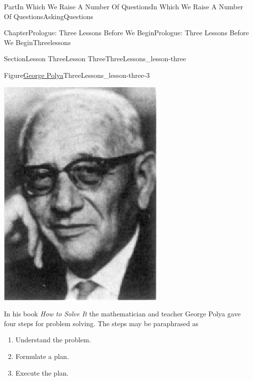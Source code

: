 \documentclass[oneside,10pt,]{book}
\numberwithin{equation}{part}
\begin{document}
\begin{partptx}{Part}{In Which We Raise A Number Of Questions}{}{In Which We Raise A Number Of Questions}{}{}{AskingQuestions}
\begin{chapterptx}{Chapter}{Prologue: Three Lessons Before We Begin}{}{Prologue: Three Lessons Before We Begin}{}{}{Threelessons}
\begin{sectionptx}{Section}{Lesson Three}{}{Lesson Three}{}{}{ThreeLessons_lesson-three}
\begin{figureptx}{Figure}{\href{https://mathshistory.st-andrews.ac.uk/Biographies/Polya/}{George Polya}\protect\footnotemark{}}{ThreeLessons_lesson-three-3}{}%
\begin{image}{0.36}{0.28}{0.36}{}%
\includegraphics[width=\linewidth]{external/images/Polya.png}
\end{image}%
\tcblower
\end{figureptx}%
%
In his book \emph{How to Solve It} the mathematician and teacher George Polya gave four steps for problem solving.  The steps may be paraphrased as%
\begin{enumerate}
\item{}Understand the problem.%
\item{}Formulate a plan.%
\item{}Execute the plan.%

\end{enumerate}
\end{sectionptx}
\end{chapterptx}
\end{partptx}
\end{document}
